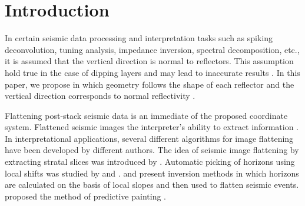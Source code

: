 \section{Introduction}

In certain seismic data processing  and interpretation tasks\new{,} such as spiking deconvolution,  tuning analysis, impedance inversion,  spectral decomposition, etc., it is  assumed that the vertical direction is normal to reflectors. This assumption  hold true in the case of dipping layers and may  lead to inaccurate results .  In this paper, we propose \old{,} in which geometry follows the shape of each reflector and the vertical direction corresponds to normal reflectivity .

 Flattening post-stack seismic data\old{,} is an immediate  of the proposed coordinate system. Flattened seismic images  the interpreter's ability to extract  information . In interpretational applications, several different algorithms for image flattening have been developed by different authors. The idea of seismic image flattening by extracting stratal slices was introduced by \cite{hongliuzeng1998}. Automatic picking of horizons using local shifts was studied by \cite{bienati2001} and \cite{stark2005}. \cite{lomask2006} and \cite{parks2010} present inversion methods in which horizons are calculated on the basis of local slopes\old{,}  and  then used to flatten seismic events. \cite{sergeyfomel2010} proposed the method of predictive painting . 

